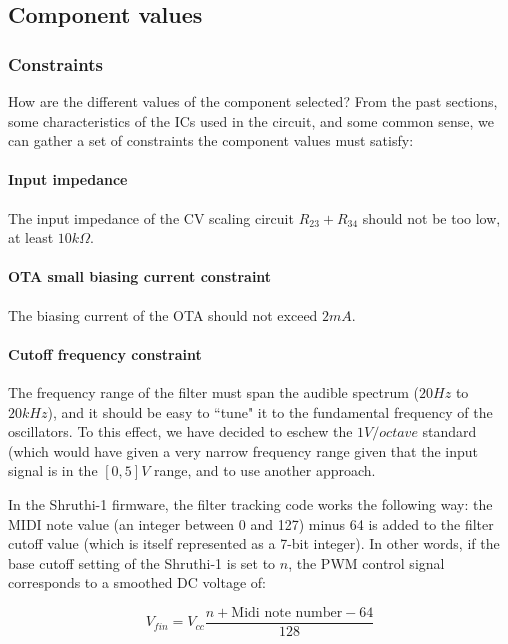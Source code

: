\documentclass[a4paper,11pt]{article}
\begin{document}
\subsection{Component values}

\subsubsection{Constraints}

How are the different values of the component selected? From the past sections, some characteristics of the ICs used in the circuit, and some common sense, we can gather a set of constraints the component values must satisfy:

\paragraph{Input impedance} The input impedance of the CV scaling circuit $R_{23} + R_{34}$ should not be too low, at least $10k \Omega$.

\paragraph{OTA small biasing current constraint} The biasing current of the OTA should not exceed $2mA$.

\paragraph{Cutoff frequency constraint} The frequency range of the filter must span the audible spectrum ($20 Hz$ to $20kHz$), and it should be easy to ``tune" it to the fundamental frequency of the oscillators. To this effect, we have decided to eschew the $1 V/octave$ standard (which would have given a very narrow frequency range given that the input signal is in the $[0, 5]V$ range, and to use another approach.

In the Shruthi-1 firmware, the filter tracking code works the following way: the MIDI note value (an integer between 0 and 127) minus 64 is added to the filter cutoff value (which is itself represented as a 7-bit integer). In other words, if the base cutoff setting of the Shruthi-1 is set to $n$, the PWM control signal corresponds to a smoothed DC voltage of:

\begin{equation}
V_{fin} = V_{cc} \frac{n + \mbox{Midi note number} - 64}{128}
\end{equation}
\end{document}
